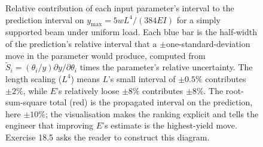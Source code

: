 \begin{figure}[htbp]
\begin{tikzpicture}[font=\small]
\end{tikzpicture}
\caption[Tornado diagram: parameter sensitivity for the beam-deflection
model]{Relative contribution of each input parameter's interval to the
prediction interval on $y_{\max} = 5 w L^4 / (384 E I)$ for a simply
supported beam under uniform load. Each blue bar is the half-width of
the prediction's relative interval that a $\pm$one-standard-deviation
move in the parameter would produce, computed from
$\tilde S_i = (\theta_i / y) \partial y / \partial \theta_i$ times the
parameter's relative uncertainty. The length scaling ($L^4$) means
$L$'s small interval of $\pm 0.5\%$ contributes $\pm 2\%$, while $E$'s
relatively loose $\pm 8\%$ contributes $\pm 8\%$. The root-sum-square
total (red) is the propagated interval on the prediction, here
$\pm 10\%$; the visualisation makes the ranking explicit and tells the
engineer that improving $E$'s estimate is the highest-yield move.
Exercise 18.5 asks the reader to construct this diagram.}
\label{fig:vol02:ch18:sensitivity-tornado}
\end{figure}

